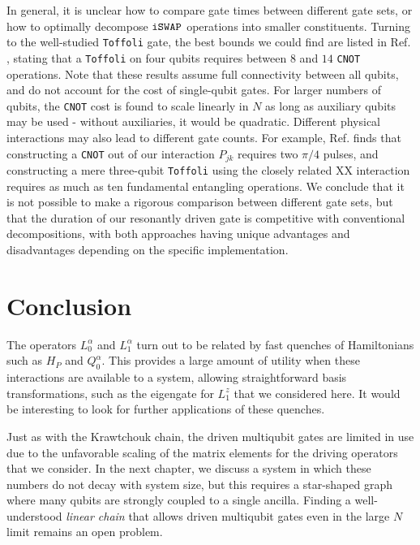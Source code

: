 In general, it is unclear how to compare gate times between different gate sets, or how to optimally decompose $\texttt{iSWAP}$ operations into smaller constituents. Turning to the well-studied \texttt{Toffoli} gate, the best bounds we could find are listed in Ref. \cite{Shende2009}, stating that a \texttt{Toffoli} on four qubits requires between $8$ and $14$ \texttt{CNOT} operations. Note that these results assume full connectivity between all qubits, and do not account for the cost of single-qubit gates. For larger numbers of qubits, the \texttt{CNOT} cost is found to scale linearly in $N$ as long as auxiliary qubits may be used - without auxiliaries, it would be quadratic. Different physical interactions may also lead to different gate counts. For example, Ref. \cite{Schuch2003} finds that constructing a \texttt{CNOT} out of our interaction $P_{jk}$ requires two $\pi/4$ pulses, and constructing a mere three-qubit \texttt{Toffoli} using the closely related XX interaction requires as much as ten fundamental entangling operations. We conclude that it is not possible to make a rigorous comparison between different gate sets, but that the duration of our resonantly driven gate is competitive with conventional decompositions, with both approaches having unique advantages and disadvantages depending on the specific implementation.  


\section{Conclusion}
The operators $L_0^\alpha$ and $L_1^\alpha$ turn out to be related by fast quenches of Hamiltonians such as $H_P$ and $Q_0^\alpha$. This provides a large amount of utility when these interactions are available to a system, allowing straightforward basis transformations, such as the eigengate for $L_1^z$ that we considered here. It would be interesting to look for further applications of these quenches. 

Just as with the Krawtchouk chain, the driven multiqubit gates are limited in use due to the unfavorable scaling of the matrix elements for the driving operators that we consider. In the next chapter, we discuss a system in which these numbers do not decay with system size, but this requires a star-shaped graph where many qubits are strongly coupled to a single ancilla. Finding a well-understood \emph{linear chain} that allows driven multiqubit gates even in the large $N$ limit remains an open problem.

